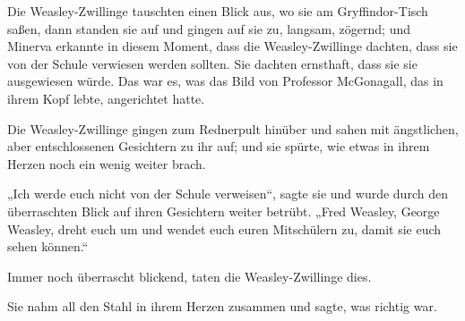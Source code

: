 
Die Weasley-Zwillinge tauschten einen Blick aus, wo sie am Gryffindor-Tisch saßen, dann standen sie auf und gingen auf sie zu, langsam, zögernd; und Minerva erkannte in diesem Moment, dass die Weasley-Zwillinge dachten, dass sie von der Schule verwiesen werden sollten.
Sie dachten ernsthaft, dass sie sie ausgewiesen würde. Das war es, was das Bild von Professor McGonagall, das in ihrem Kopf lebte, angerichtet hatte.

Die Weasley-Zwillinge gingen zum Rednerpult hinüber und sahen mit ängstlichen, aber entschlossenen Gesichtern zu ihr auf; und sie spürte, wie etwas in ihrem Herzen noch ein wenig weiter brach.

„Ich werde euch nicht von der Schule verweisen“, sagte sie und wurde durch den überraschten Blick auf ihren Gesichtern weiter betrübt.
„Fred Weasley, George Weasley, dreht euch um und wendet euch euren Mitschülern zu, damit sie euch sehen können.“

Immer noch überrascht blickend, taten die Weasley-Zwillinge dies.

Sie nahm all den Stahl in ihrem Herzen zusammen und sagte, was richtig war.

